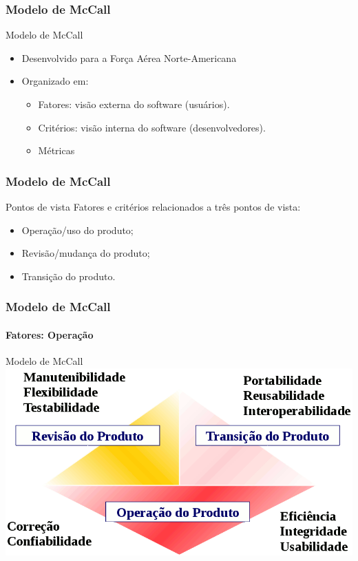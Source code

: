 \begin{frame}[parent={ie:agenda}, hasnext=false, hasprev=false]
	\frametitle{Modelo de McCall}

	\begin{block:concept}{Modelo de McCall}
		\begin{itemize}
			\item Desenvolvido para a Força Aérea Norte-Americana
			\item Organizado em:
			\begin{itemize}
				\item Fatores: visão externa do software (usuários).
				\item Critérios: visão interna do software (desenvolvedores).
				\item Métricas
			\end{itemize}
		\end{itemize}
	\end{block:concept}
\end{frame}


\begin{frame}[hasnext=true, hasprev=true]
	\frametitle{Modelo de McCall}

	\begin{block:fact}{Pontos de vista}
		Fatores e critérios relacionados a três pontos de vista:
		\begin{itemize}
			\item Operação/uso do produto;
			\item Revisão/mudança do produto;
			\item Transição do produto.
		\end{itemize}
	\end{block:fact}
\end{frame}


\begin{frame}
	\frametitle{Modelo de McCall}
	\framesubtitle{Fatores: Operação}

	\begin{block:concept}{Modelo de McCall}
		\centering
		\includegraphics[width=.7\textwidth]{software-engineering/project-management/product/mccall/mccall}
	\end{block:concept}
\end{frame}


